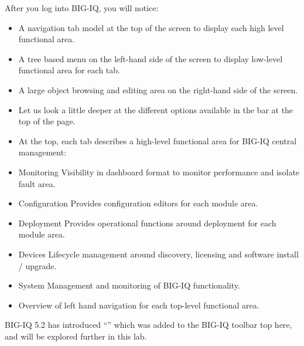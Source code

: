 \documentclass[letterpaper,10pt,english]{sphinxmanual}
\begin{document}
After you log into BIG-IQ, you will notice:
\begin{itemize}
\item {} 
A navigation tab model at the top of the screen to display each high
level functional area.

\item {} 
A tree based menu on the left-hand side of the screen to display
low-level functional area for each tab.

\item {} 
A large object browsing and editing area on the right-hand side of
the screen.


\item {} 
Let us look a little deeper at the different options available in the
bar at the top of the page.


\item {} 
At the top, each tab describes a high-level functional area for
BIG-IQ central management:

\item {} 
Monitoring \textendash{}Visibility in dashboard format to monitor performance and
isolate fault area.

\item {} 
Configuration \textendash{} Provides configuration editors for each module area.

\item {} 
Deployment \textendash{} Provides operational functions around deployment for
each module area.

\item {} 
Devices \textendash{} Lifecycle management around discovery, licensing and
software install / upgrade.

\item {} 
System \textendash{} Management and monitoring of BIG-IQ functionality.

\item {} 
Overview of left hand navigation for each top-level functional area.


\end{itemize}

BIG-IQ 5.2 has introduced “” which was added to the
BIG-IQ toolbar top here, and will be explored further in this lab.
\end{document}
